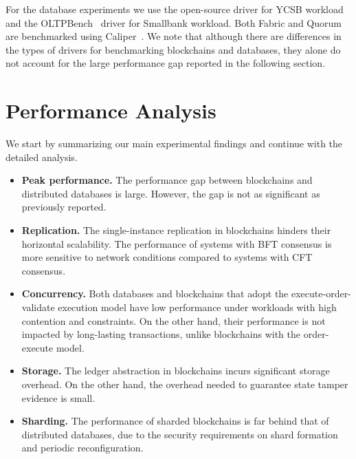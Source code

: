For the database experiments we use the open-source driver for YCSB workload~\cite{web:ycsb} and 
the OLTPBench~\cite{difallah2013oltp} driver for Smallbank workload.  Both Fabric and Quorum are
benchmarked using Caliper~\cite{web:caliper}. We note that although there are differences in the types of
drivers for benchmarking blockchains and databases, they alone do not account for the large performance gap
reported in the following section. 

\section{Performance Analysis}
\label{twin:sec:result}
We start by summarizing our main experimental findings and continue with the detailed analysis.
\begin{itemize}
  \item \textbf{Peak performance. }  The performance gap between blockchains and distributed databases is large. However, the gap is not as significant as previously reported. 
  \item \textbf{Replication. } The single-instance replication in blockchains hinders their horizontal 
  scalability. The performance of systems with BFT consensus is more sensitive to network conditions compared to systems with  
  CFT consensus. 
  \item \textbf{Concurrency. } Both databases and blockchains that adopt the execute-order-validate execution 
  model have low performance under workloads with high contention and constraints.  On the other hand, their
  performance is not impacted by long-lasting transactions, unlike blockchains with the order-execute model.
  \item \textbf{Storage. } The ledger abstraction in blockchains incurs significant storage overhead. On the 
  other hand, the overhead needed to guarantee state tamper evidence is small.
  \item \textbf{Sharding. } The performance of sharded blockchains is far behind that of distributed
  databases, due to the security requirements on shard formation and periodic reconfiguration.
\end{itemize}